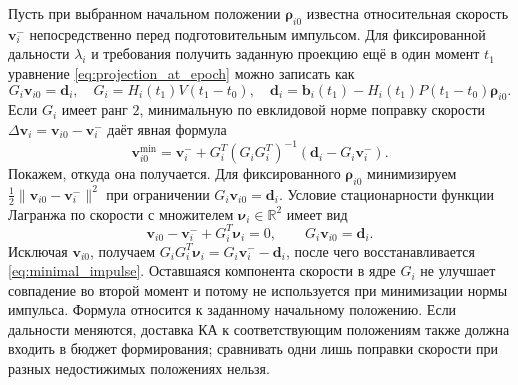 \documentclass[a4paper,12pt]{article}
\begin{document}
Пусть при выбранном начальном положении $\boldsymbol\rho_{i0}$ известна относительная скорость $\mathbf v_i^-$ непосредственно перед подготовительным импульсом. Для фиксированной дальности $\lambda_i$ и требования получить заданную проекцию ещё в один момент $t_1$ уравнение \eqref{eq:projection_at_epoch} можно записать как
\begin{equation}
    G_i\mathbf v_{i0}=\mathbf d_i,
    \quad
    G_i=H_i(t_1)V(t_1-t_0),
    \quad
    \mathbf d_i=\mathbf b_i(t_1)
       -H_i(t_1)P(t_1-t_0)\boldsymbol\rho_{i0}.
    \label{eq:velocity_constraint}
\end{equation}
Если $G_i$ имеет ранг $2$, минимальную по евклидовой норме поправку скорости $\Delta\mathbf v_i=\mathbf v_{i0}-\mathbf v_i^-$ даёт явная формула
\begin{equation}
    \mathbf v_{i0}^{\mathrm{min}}
       =\mathbf v_i^-+G_i^T(G_iG_i^T)^{-1}
                     (\mathbf d_i-G_i\mathbf v_i^-).
    \label{eq:minimal_impulse}
\end{equation}
Покажем, откуда она получается. Для фиксированного $\boldsymbol\rho_{i0}$ минимизируем $\frac12\|\mathbf v_{i0}-\mathbf v_i^-\|^2$ при ограничении $G_i\mathbf v_{i0}=\mathbf d_i$. Условие стационарности функции Лагранжа по скорости с множителем $\boldsymbol\nu_i\in\mathbb R^2$ имеет вид
\begin{equation}
    \mathbf v_{i0}-\mathbf v_i^-+G_i^T\boldsymbol\nu_i=0,
    \qquad G_i\mathbf v_{i0}=\mathbf d_i.
    \label{eq:impulse_stationarity}
\end{equation}
Исключая $\mathbf v_{i0}$, получаем $G_iG_i^T\boldsymbol\nu_i=G_i\mathbf v_i^--\mathbf d_i$, после чего восстанавливается \eqref{eq:minimal_impulse}. Оставшаяся компонента скорости в ядре $G_i$ не улучшает совпадение во второй момент и потому не используется при минимизации нормы импульса. Формула относится к заданному начальному положению. Если дальности меняются, доставка КА к соответствующим положениям также должна входить в бюджет формирования; сравнивать одни лишь поправки скорости при разных недостижимых положениях нельзя.
\end{document}
